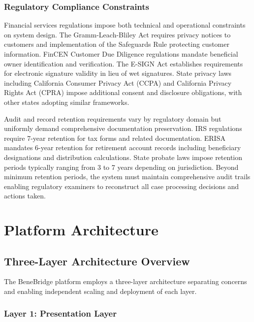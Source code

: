 \subsubsection{Regulatory Compliance Constraints}

Financial services regulations impose both technical and operational constraints on system design. The Gramm-Leach-Bliley Act requires privacy notices to customers and implementation of the Safeguards Rule protecting customer information. FinCEN Customer Due Diligence regulations mandate beneficial owner identification and verification. The E-SIGN Act establishes requirements for electronic signature validity in lieu of wet signatures. State privacy laws including California Consumer Privacy Act (CCPA) and California Privacy Rights Act (CPRA) impose additional consent and disclosure obligations, with other states adopting similar frameworks.

Audit and record retention requirements vary by regulatory domain but uniformly demand comprehensive documentation preservation. IRS regulations require 7-year retention for tax forms and related documentation. ERISA mandates 6-year retention for retirement account records including beneficiary designations and distribution calculations. State probate laws impose retention periods typically ranging from 3 to 7 years depending on jurisdiction. Beyond minimum retention periods, the system must maintain comprehensive audit trails enabling regulatory examiners to reconstruct all case processing decisions and actions taken.

\section{Platform Architecture}\label{sec:platform_architecture}

\subsection{Three-Layer Architecture Overview}

The BeneBridge platform employs a three-layer architecture separating concerns and enabling independent scaling and deployment of each layer.

\subsubsection{Layer 1: Presentation Layer}

